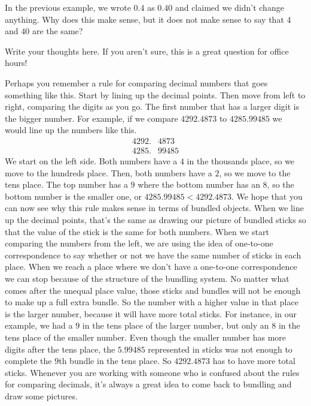 \documentclass{ximera}
\begin{document}
\begin{question}
In the previous example, we wrote $0.4$ as $0.40$ and claimed we didn't change anything. Why does this make sense, but it does not make sense to say that $4$ and $40$ are the same?
\begin{freeResponse}
Write your thoughts here. If you aren't sure, this is a great question for office hours!
\end{freeResponse}
\end{question}

Perhaps you remember a rule for comparing decimal numbers that goes something like this. Start by lining up the decimal points. Then move from left to right, comparing the digits as you go. The first number that has a larger digit is the bigger number. For example, if we compare $4292.4873$ to $4285.99485$ we would line up the numbers like this.
\begin{align*}
4292.&4873\\
4285.&99485
\end{align*}
We start on the left side. Both numbers have a $4$ in the thousands place, so we move to the hundreds place. Then, both numbers have a $2$, so we move to the tens place. The top number has a $9$ where the bottom number has an $8$, so the bottom number is the smaller one, or $4285.99485 < 4292.4873$. We hope that you can now see why this rule makes sense in terms of bundled objects. When we line up the decimal points, that's the same as drawing our picture of bundled sticks so that the value of the stick is the same for both numbers. When we start comparing the numbers from the left, we are using the idea of one-to-one correspondence to say whether or not we have the same number of sticks in each place. When we reach a place where we don't have a one-to-one correspondence we can stop because of the structure of the bundling system. No matter what comes after the unequal place value, those sticks and bundles will not be enough to make up a full extra bundle. So the number with a higher value in that place is the larger number, because it will have more total sticks. For instance, in our example, we had a $9$ in the tens place of the larger number, but only an $8$ in the tens place of the smaller number. Even though the smaller number has more digits after the tens place, the $5.99485$ represented in sticks was not enough to complete the $9$th bundle in the tens place. So $4292.4873$ has to have more total sticks. Whenever you are working with someone who is confused about the rules for comparing decimals, it's always a great idea to come back to bundling and draw some pictures.
\end{document}
